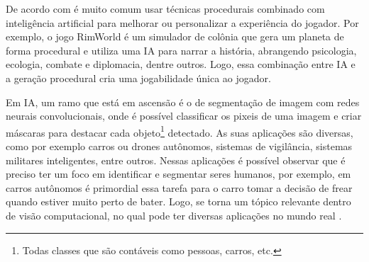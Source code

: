 


De acordo com  é muito comum usar técnicas procedurais combinado com inteligência artificial para melhorar ou personalizar a experiência do jogador. Por exemplo, o jogo RimWorld é um simulador de colônia que gera um planeta de forma procedural e utiliza uma IA para narrar a história, abrangendo psicologia, ecologia, combate e diplomacia, dentre outros. Logo, essa combinação entre IA e a geração procedural cria uma jogabilidade única ao jogador.


Em IA, um ramo que está em ascensão é o de segmentação de imagem com redes neurais convolucionais, onde é possível classificar os pixeis de uma imagem e criar máscaras  para destacar cada objeto\footnote{Todas classes que são contáveis como pessoas, carros, etc.} detectado. As suas aplicações são diversas, como por exemplo carros ou drones autônomos, sistemas de vigilância, sistemas militares inteligentes, entre outros. Nessas aplicações é possível observar que é preciso ter um foco em identificar e segmentar seres humanos, por exemplo, em carros autônomos é primordial essa tarefa para o carro tomar a decisão de frear quando estiver muito perto de bater. Logo, se torna um tópico relevante dentro de visão computacional, no qual pode ter diversas aplicações no mundo real \cite{kirillov2019panoptic, dp_semantic_segmantation}.

